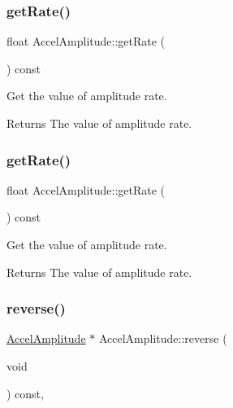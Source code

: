 \subsubsection{\texorpdfstring{get\+Rate()}{getRate()}\hspace{0.1cm}{\footnotesize\ttfamily [1/2]}}
{\footnotesize\ttfamily float Accel\+Amplitude\+::get\+Rate (\begin{DoxyParamCaption}{ }\end{DoxyParamCaption}) const\hspace{0.3cm}{\ttfamily [inline]}}



Get the value of amplitude rate. 

\begin{DoxyReturn}{Returns}
The value of amplitude rate. 
\end{DoxyReturn}
\mbox{\label{classAccelAmplitude_a890ef366cbe8aeb077fb6b3a2c3324b0}} 
\subsubsection{\texorpdfstring{get\+Rate()}{getRate()}\hspace{0.1cm}{\footnotesize\ttfamily [2/2]}}
{\footnotesize\ttfamily float Accel\+Amplitude\+::get\+Rate (\begin{DoxyParamCaption}{ }\end{DoxyParamCaption}) const\hspace{0.3cm}{\ttfamily [inline]}}



Get the value of amplitude rate. 

\begin{DoxyReturn}{Returns}
The value of amplitude rate. 
\end{DoxyReturn}
\mbox{\label{classAccelAmplitude_a9264913ab0a54485fd26f7110fdd0921}} 
\subsubsection{\texorpdfstring{reverse()}{reverse()}\hspace{0.1cm}{\footnotesize\ttfamily [1/2]}}
{\footnotesize\ttfamily \hyperlink{classAccelAmplitude}{Accel\+Amplitude} $\ast$ Accel\+Amplitude\+::reverse (\begin{DoxyParamCaption}\item[{void}]{ }\end{DoxyParamCaption}) const\hspace{0.3cm}{\ttfamily [override]}, {\ttfamily [virtual]}}

